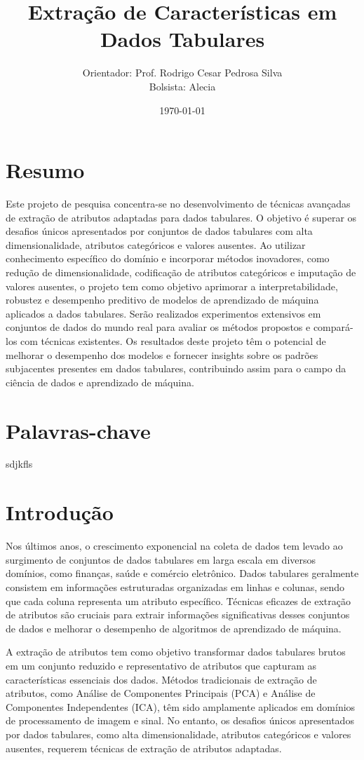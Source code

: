 \documentclass{article}
\title{Extração de Características em Dados Tabulares}
\author{Orientador: Prof. Rodrigo Cesar Pedrosa Silva \\
Bolsista: Alecia}
\date{\today}
\begin{document}
\maketitle

\section*{Resumo}
Este projeto de pesquisa concentra-se no desenvolvimento de técnicas avançadas de extração de atributos adaptadas para dados tabulares. O objetivo é superar os desafios únicos apresentados por conjuntos de dados tabulares com alta dimensionalidade, atributos categóricos e valores ausentes. Ao utilizar conhecimento específico do domínio e incorporar métodos inovadores, como redução de dimensionalidade, codificação de atributos categóricos e imputação de valores ausentes, o projeto tem como objetivo aprimorar a interpretabilidade, robustez e desempenho preditivo de modelos de aprendizado de máquina aplicados a dados tabulares. Serão realizados experimentos extensivos em conjuntos de dados do mundo real para avaliar os métodos propostos e compará-los com técnicas existentes. Os resultados deste projeto têm o potencial de melhorar o desempenho dos modelos e fornecer insights sobre os padrões subjacentes presentes em dados tabulares, contribuindo assim para o campo da ciência de dados e aprendizado de máquina.
   
\section*{Palavras-chave}
    sdjkfls
   
\section{Introdução}
	
Nos últimos anos, o crescimento exponencial na coleta de dados tem levado ao surgimento de conjuntos de dados tabulares em larga escala em diversos domínios, como finanças, saúde e comércio eletrônico. Dados tabulares geralmente consistem em informações estruturadas organizadas em linhas e colunas, sendo que cada coluna representa um atributo específico. Técnicas eficazes de extração de atributos são cruciais para extrair informações significativas desses conjuntos de dados e melhorar o desempenho de algoritmos de aprendizado de máquina.

A extração de atributos tem como objetivo transformar dados tabulares brutos em um conjunto reduzido e representativo de atributos que capturam as características essenciais dos dados. Métodos tradicionais de extração de atributos, como Análise de Componentes Principais (PCA) e Análise de Componentes Independentes (ICA), têm sido amplamente aplicados em domínios de processamento de imagem e sinal. No entanto, os desafios únicos apresentados por dados tabulares, como alta dimensionalidade, atributos categóricos e valores ausentes, requerem técnicas de extração de atributos adaptadas.
\end{document}
